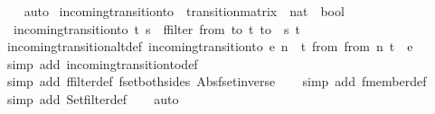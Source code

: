 \begin{isabellebody}
\ \ \isamarkupfalse%
\ auto%
\endisatagproof
{\isafoldproof}%
%
\isadelimproof
\isanewline
%
\endisadelimproof
\isanewline
{}\isamarkupfalse%
\ incoming{\isacharunderscore}transition{\isacharunderscore}to\ {\isacharcolon}{\isacharcolon}\ {\isachardoublequoteopen}transition{\isacharunderscore}matrix\ {\isasymRightarrow}\ nat\ {\isasymRightarrow}\ bool{\isachardoublequoteclose}\ \isanewline
\ \ {\isachardoublequoteopen}incoming{\isacharunderscore}transition{\isacharunderscore}to\ t\ s\ {\isacharequal}\ {\isacharparenleft}{\isacharparenleft}ffilter\ {\isacharparenleft}{\isasymlambda}{\isacharparenleft}{\isacharparenleft}from{\isacharcomma}\ to{\isacharparenright}{\isacharcomma}\ t{\isacharparenright}{\isachardot}\ to\ {\isacharequal}\ s{\isacharparenright}\ t{\isacharparenright}\ {\isasymnoteq}\ {\isacharbraceleft}{\isacharbar}{\isacharbar}{\isacharbraceright}{\isacharparenright}{\isachardoublequoteclose}\isanewline
\isanewline
{}\isamarkupfalse%
\ incoming{\isacharunderscore}transition{\isacharunderscore}alt{\isacharunderscore}def{\isacharcolon}\ {\isachardoublequoteopen}incoming{\isacharunderscore}transition{\isacharunderscore}to\ e\ n\ {\isacharequal}\ {\isacharparenleft}{\isasymexists}t\ from{\isachardot}\ {\isacharparenleft}{\isacharparenleft}from{\isacharcomma}\ n{\isacharparenright}{\isacharcomma}\ t{\isacharparenright}\ {\isacharbar}{\isasymin}{\isacharbar}\ e{\isacharparenright}{\isachardoublequoteclose}\isanewline
%
\isadelimproof
\ \ %
\endisadelimproof
%
\isatagproof
{}\isamarkupfalse%
\ {\isacharparenleft}simp\ add{\isacharcolon}\ incoming{\isacharunderscore}transition{\isacharunderscore}to{\isacharunderscore}def{\isacharparenright}\isanewline
\ \ \isamarkupfalse%
\ {\isacharparenleft}simp\ add{\isacharcolon}\ ffilter{\isacharunderscore}def\ fset{\isacharunderscore}both{\isacharunderscore}sides\ Abs{\isacharunderscore}fset{\isacharunderscore}inverse{\isacharparenright}\isanewline
\ \ \isamarkupfalse%
\ {\isacharparenleft}simp\ add{\isacharcolon}\ fmember{\isacharunderscore}def{\isacharparenright}\isanewline
\ \ \isamarkupfalse%
\ {\isacharparenleft}simp\ add{\isacharcolon}\ Set{\isachardot}filter{\isacharunderscore}def{\isacharparenright}\isanewline
\ \ \isamarkupfalse%
\ auto%
\endisatagproof
{\isafoldproof}%
%
\isadelimproof
\isanewline
%
\endisadelimproof
%
\isadelimtheory
\isanewline
%
\endisadelimtheory
%
\isatagtheory
{}\isamarkupfalse%
%
\endisatagtheory
{\isafoldtheory}%
%
\isadelimtheory
%
\endisadelimtheory
%
\end{isabellebody}%
